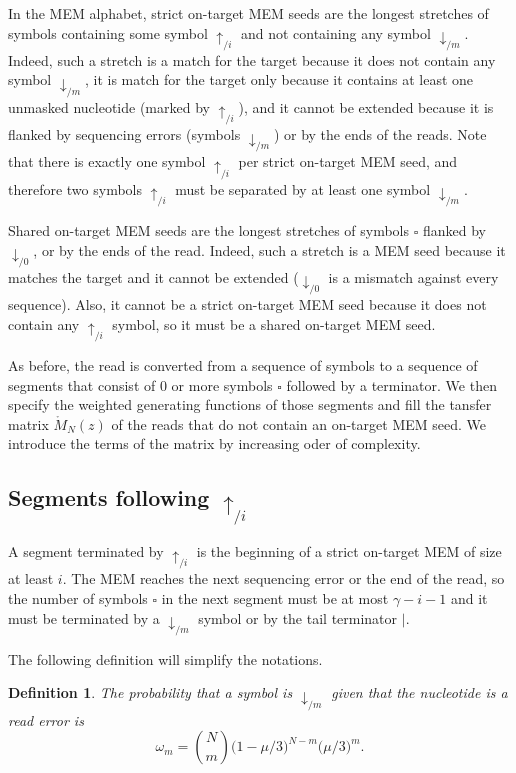 \documentclass{article}
\newtheorem{definition}{Definition}
\begin{document}
In the MEM alphabet, strict on-target MEM seeds are the longest stretches
of symbols containing some symbol $\uparrow_{/i}$ and not containing any
symbol $\downarrow_{/m}$. Indeed, such a stretch is a match for the target
because it does not contain any symbol $\downarrow_{/m}$, it is match for
the target only because it contains at least one unmasked nucleotide
(marked by $\uparrow_{/i}$), and it cannot be extended because it is
flanked by sequencing errors (symbols $\downarrow_{/m}$) or by the ends of
the reads. Note that there is exactly one symbol $\uparrow_{/i}$ per
strict on-target MEM seed, and therefore two symbols $\uparrow_{/i}$ must
be separated by at least one symbol $\downarrow_{/m}$.

Shared on-target MEM seeds are the longest stretches of symbols $\square$
flanked by $\downarrow_{/0}$, or by the ends of the read. Indeed, such a
stretch is a MEM seed because it matches the target and it cannot be
extended ($\downarrow_{/0}$ is a mismatch against every sequence). Also,
it cannot be a strict on-target MEM seed because it does not contain any
$\uparrow_{/i}$ symbol, so it must be a shared on-target MEM seed.

As before, the read is converted from a sequence of symbols to a sequence
of segments that consist of 0 or more symbols $\square$ followed by a
terminator. We then specify the weighted generating functions of those
segments and fill the tansfer matrix $\mathring{M}_N(z)$ of the reads that
do not contain an on-target MEM seed. We introduce the terms of the matrix
by increasing oder of complexity.


\subsection{Segments following $\uparrow_{/i}$}

A segment terminated by $\uparrow_{/i}$ is the beginning of a strict
on-target MEM of size at least $i$. The MEM reaches the next sequencing
error or the end of the read, so the number of symbols $\square$ in the
next segment must be at most $\gamma-i-1$ and it must be terminated by a
$\downarrow_{/m}$ symbol or by the tail terminator $|$.

The following definition will simplify the notations.

\begin{definition}
The probability that a symbol is $\downarrow_{/m}$ given that the
nucleotide is a read error is
\begin{equation}
\label{eq:omega}
\omega_m = {N \choose m} \big(1 - \mu/3\big)^{N-m} \big(\mu/3\big)^m.
\end{equation}
\end{definition}
\end{document}
